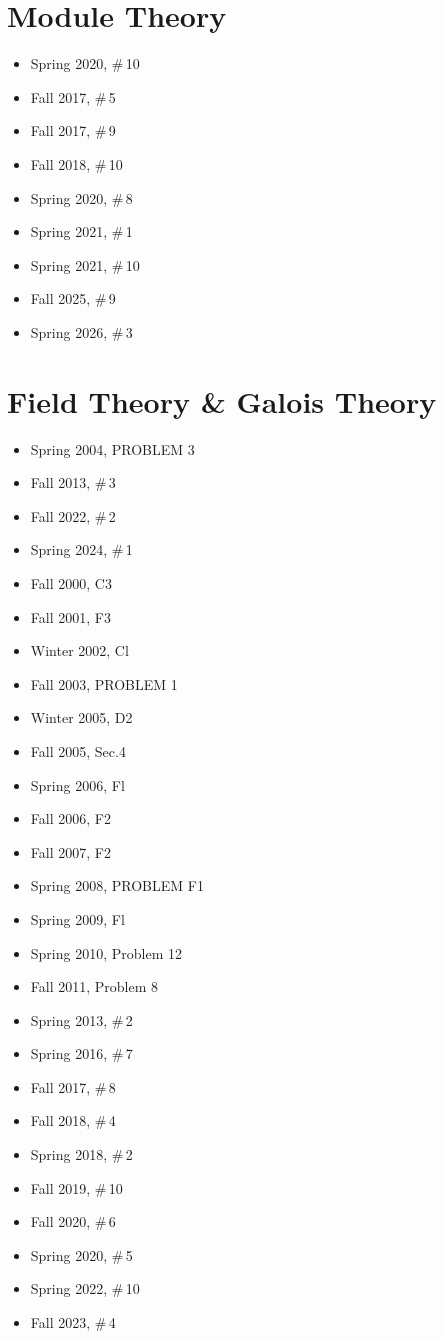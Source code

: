 \documentclass[11pt,letterpaper]{book}
\begin{document}
\section*{Module Theory}
\begin{itemize}
  \item Spring 2020, \#\,10
  \item Fall 2017, \#\,5
  \item Fall 2017, \#\,9
  \item Fall 2018, \#\,10
  \item Spring 2020, \#\,8
  \item Spring 2021, \#\,1
  \item Spring 2021, \#\,10
  \item Fall 2025, \#\,9
  \item Spring 2026, \#\,3
\end{itemize}

\section*{Field Theory \& Galois Theory}
\begin{itemize}
  \item Spring 2004, PROBLEM 3
  \item Fall 2013, \#\,3
  \item Fall 2022, \#\,2
  \item Spring 2024, \#\,1
  \item Fall 2000, C3
  \item Fall 2001, F3
  \item Winter 2002, Cl
  \item Fall 2003, PROBLEM 1
  \item Winter 2005, D2
  \item Fall 2005, Sec.4
  \item Spring 2006, Fl
  \item Fall 2006, F2
  \item Fall 2007, F2
  \item Spring 2008, PROBLEM F1
  \item Spring 2009, Fl
  \item Spring 2010, Problem 12
  \item Fall 2011, Problem 8
  \item Spring 2013, \#\,2
  \item Spring 2016, \#\,7
  \item Fall 2017, \#\,8
  \item Fall 2018, \#\,4
  \item Spring 2018, \#\,2
  \item Fall 2019, \#\,10
  \item Fall 2020, \#\,6
  \item Spring 2020, \#\,5
  \item Spring 2022, \#\,10
  \item Fall 2023, \#\,4
\end{itemize}
\end{document}
